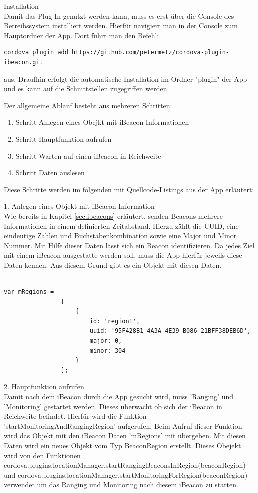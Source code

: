 Installation
\\Damit das Plug-In genutzt werden kann, muss es erst über die Console des Betreibssystem installiert werden.
Hierfür navigiert man in der Console zum Hauptordner der App. Dort führt man den Befehl:

\begin{lstlisting}
cordova plugin add https://github.com/petermetz/cordova-plugin-ibeacon.git
\end{lstlisting} 


aus. Draufhin erfolgt die automatische Installation im Ordner "plugin" der App und es kann auf die Schnittstellen zugegriffen werden.

Der allgemeine Ablauf besteht aus mehreren Schritten:
\begin{enumerate}
\item Schritt Anlegen eines Obejkt mit iBeacon Informationen
\item Schritt Hauptfunktion aufrufen
\item Schritt Warten auf einen iBeacon in Reichweite
\item Schritt Daten auslesen
\end{enumerate}
Diese Schritte werden im folgenden mit Quellcode-Listings aus der App erläutert:

1. Anlegen eines Objekt mit iBeacon Information
\\Wie bereits in Kapitel \ref{sec:ibeacons} erläutert, senden Beacons mehrere Informationen in einem definierten Zeitabstand. Hierzu zählt die UUID, eine eindeutige Zahlen und Buchstabenkombination sowie eine Major und Minor Nummer. Mit Hilfe dieser Daten lässt sich ein Beacon identifizieren. Da jedes Ziel mit einem iBeacon ausgestatte werden soll, muss die App hierfür jeweils diese Daten kennen. Aus diesem Grund gibt es ein Objekt mit diesen Daten.
 
\begin{lstlisting}[frame=single]  % Start your code-block

var mRegions =
				[
					{
						id: 'region1',
						uuid: '95F428B1-4A3A-4E39-B086-21BFF38DEB6D',
						major: 0,
						minor: 304
					}
				];
\end{lstlisting}


2. Hauptfunktion aufrufen
\\Damit nach dem iBeacon durch die App gesucht wird, muss 'Ranging' und 'Monitoring' gestartet werden. Dieses überwacht ob sich der iBeacon in Reichweite befindet. Hierfür wird die Funktion 'startMonitoringAndRangingRegion' aufgerufen. Beim Aufruf dieser Funktion wird das Objekt mit den iBeacon Daten 'mRegions' mit übergeben. Mit diesen Daten wird ein neues Objekt vom Typ BeaconRegion erstellt. Dieses Obejekt wird von den Funktionen  cordova.plugins.locationManager.startRangingBeaconsInRegion(beaconRegion) und cordova.plugins.locationManager.startMonitoringForRegion(beaconRegion) verwendet um das Ranging und Monitoring nach diesem iBeacon zu starten.

